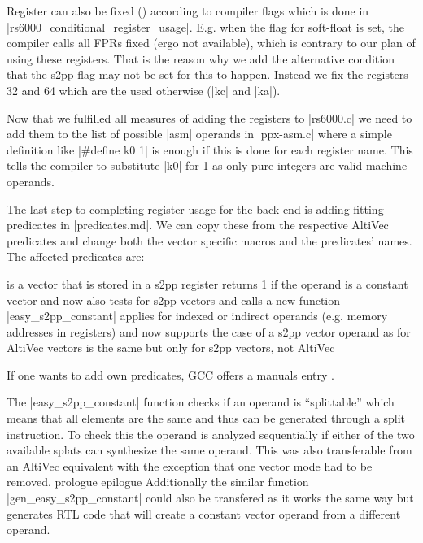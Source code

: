 Register can also be fixed () according to compiler flags which is done in |rs6000_conditional_register_usage|.
E.g. when the flag for soft-float is set, the compiler calls all FPRs fixed (ergo not available), which is contrary to our plan of using these registers.
That is the reason why we add the alternative condition that the s2pp flag may not be set for this to happen.
Instead we fix the registers 32 and 64 which are the used otherwise (|kc| and |ka|).

Now that we fulfilled all measures of adding the registers to |rs6000.c| we need to add them to the list of possible |asm| operands in 
|ppx-asm.c| where a simple definition like |#define k0 1| is enough if this is done for each register name.
This tells the compiler to substitute |k0| for 1 as only pure integers are valid machine operands.

The last step to completing register usage for the back-end is adding fitting predicates in |predicates.md|.
We can copy these from the respective AltiVec predicates and change both the vector specific macros and the predicates' names.
The affected predicates are:
\begin{description}
         is a vector that is stored in a s2pp register
         returns 1 if the operand is a constant vector and now also tests for s2pp vectors and calls a new function |easy_s2pp_constant|
         applies for indexed or indirect operands (e.g. memory addresses in registers) and now supports the case of a s2pp vector operand as for AltiVec vectors
         is the same but only for s2pp vectors, not AltiVec
\end{description}
If one wants to add own predicates, GCC offers a manuals entry \cite{GCCint:predicates}.

The |easy_s2pp_constant| function checks if an operand is ``splittable'' which means that all elements are the same and thus can be generated through a split instruction.
To check this the operand is analyzed sequentially if either of the two available splats can synthesize the same operand.
This was also transferable from an AltiVec equivalent with the exception that one vector mode had to be removed.
prologue epilogue
Additionally the similar function |gen_easy_s2pp_constant| could also be transfered as it works the same way but generates RTL code that will create a constant vector operand from a different operand.


